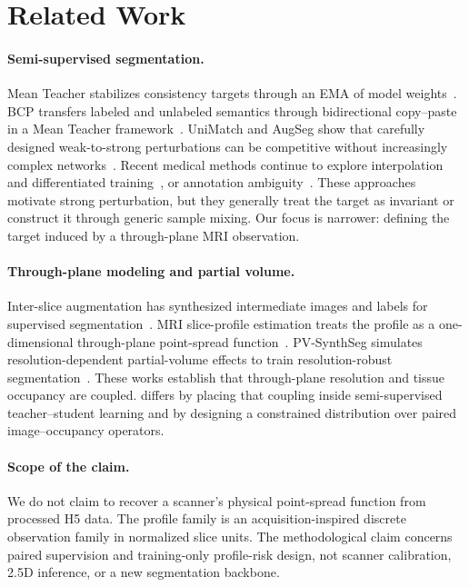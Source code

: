 \section{Related Work}

\paragraph{Semi-supervised segmentation.}
Mean Teacher stabilizes consistency targets through an EMA of model weights~\cite{tarvainen2017mean}. BCP transfers labeled and unlabeled semantics through bidirectional copy--paste in a Mean Teacher framework~\cite{bai2023bcp}. UniMatch and AugSeg show that carefully designed weak-to-strong perturbations can be competitive without increasingly complex networks~\cite{yang2023unimatch,zhao2023augseg}. Recent medical methods continue to explore interpolation and differentiated training~\cite{hu2025betafft}, or annotation ambiguity~\cite{kumari2025ambissl}. These approaches motivate strong perturbation, but they generally treat the target as invariant or construct it through generic sample mixing. Our focus is narrower: defining the target induced by a through-plane MRI observation.

\paragraph{Through-plane modeling and partial volume.}
Inter-slice augmentation has synthesized intermediate images and labels for supervised segmentation~\cite{wu2020interslice}. MRI slice-profile estimation treats the profile as a one-dimensional through-plane point-spread function~\cite{han2021sliceprofile}. PV-SynthSeg simulates resolution-dependent partial-volume effects to train resolution-robust segmentation~\cite{billot2020pvsynthseg}. These works establish that through-plane resolution and tissue occupancy are coupled. \method differs by placing that coupling inside semi-supervised teacher--student learning and by designing a constrained distribution over paired image--occupancy operators.

\paragraph{Scope of the claim.}
We do not claim to recover a scanner's physical point-spread function from processed H5 data. The profile family is an acquisition-inspired discrete observation family in normalized slice units. The methodological claim concerns paired supervision and training-only profile-risk design, not scanner calibration, 2.5D inference, or a new segmentation backbone.
